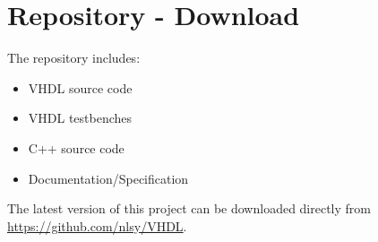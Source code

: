 \documentclass[12pt,a4 paper] {report}
\begin{document}
\newpage

\chapter{Repository - Download}
The repository includes:
\begin{itemize}
	\item VHDL source code
	\item VHDL testbenches
	\item C++ source code
	\item Documentation/Specification
\end{itemize}
The latest version of this project can be downloaded directly from \href{https://github.com/nlsy/VHDL}{https://github.com/nlsy/VHDL}. \\
\end{document}
